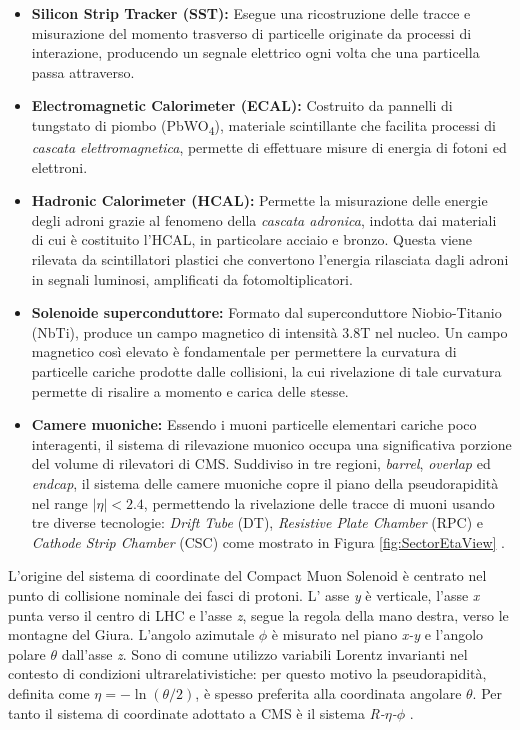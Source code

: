 \begin{itemize}
  \item \textbf{Silicon Strip Tracker (SST):} Esegue una ricostruzione delle tracce e misurazione del momento trasverso di particelle originate da processi di interazione, producendo un segnale elettrico ogni volta che una particella passa attraverso.
  \item \textbf{Electromagnetic Calorimeter (ECAL):} Costruito da pannelli di tungstato di piombo (\si{PbWO_4}), materiale scintillante che facilita processi di \textit{cascata elettromagnetica}, permette di effettuare misure di energia di fotoni ed elettroni.
  \item \textbf{Hadronic Calorimeter (HCAL):} Permette la misurazione delle energie degli adroni grazie al fenomeno della \textit{cascata adronica}, indotta dai materiali di cui è costituito l'HCAL, in particolare acciaio e bronzo. Questa viene rilevata da scintillatori plastici che convertono l'energia rilasciata dagli adroni in segnali luminosi, amplificati da fotomoltiplicatori.
  \item \textbf{Solenoide superconduttore:} Formato dal superconduttore Niobio-Titanio (NbTi), produce un campo magnetico di intensità 3.8T nel nucleo. Un campo magnetico così elevato è fondamentale per permettere la curvatura di particelle cariche prodotte dalle collisioni, la cui rivelazione di tale curvatura permette di risalire a momento e carica delle stesse.
  \item \textbf{Camere muoniche:} Essendo i muoni particelle elementari cariche poco interagenti, il sistema di rilevazione muonico occupa una significativa porzione del volume di rilevatori di CMS. Suddiviso in tre regioni, \textit{barrel}, \textit{overlap} ed \textit{endcap}, il sistema delle camere muoniche copre il piano della pseudorapidità nel range $|\eta| < 2.4$, permettendo la rivelazione delle tracce di muoni usando tre diverse tecnologie: \textit{Drift Tube} (DT), \textit{Resistive Plate Chamber} (RPC) e \textit{Cathode Strip Chamber} (CSC) come mostrato in Figura \ref{fig:SectorEtaView} \cite{TheMuonProject}.
\end{itemize}

L'origine del sistema di coordinate del Compact Muon Solenoid è centrato nel punto di collisione nominale dei fasci di protoni. L' asse \textit{y} è verticale, l'asse \textit{x} punta verso il centro di LHC e l'asse \textit{z}, segue la regola della mano destra, verso le montagne del Giura. L'angolo azimutale $\phi$ è misurato nel piano \textit{x-y} e l'angolo polare $\theta$ dall'asse \textit{z}. Sono di comune utilizzo variabili Lorentz invarianti nel contesto di condizioni ultrarelativistiche: per questo motivo la pseudorapidità, definita come $\eta = -\ln\left(\theta/2\right)$, è spesso preferita alla coordinata angolare $\theta$. Per tanto il sistema di coordinate adottato a CMS è il sistema \textit{R-$\eta$-$\phi$} \cite{Quertenmont:2010ota}.



